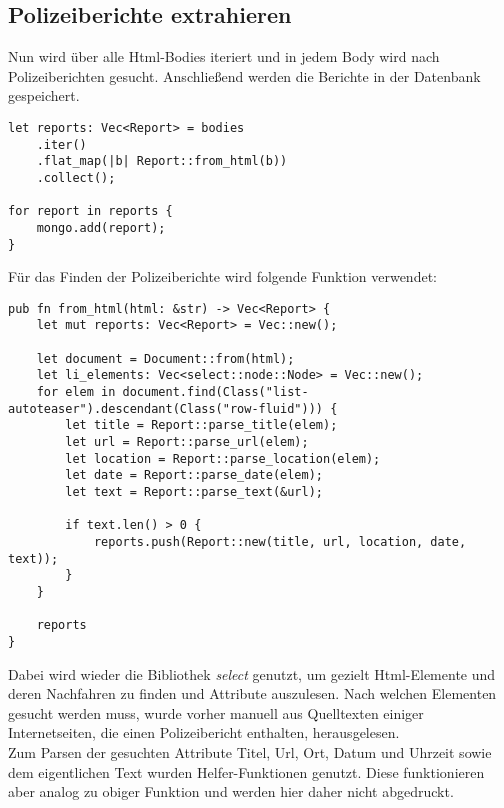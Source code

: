 \subsection{Polizeiberichte extrahieren}
Nun wird über alle Html-Bodies iteriert und in jedem Body wird nach
Polizeiberichten gesucht. Anschließend werden die Berichte in der Datenbank
gespeichert.

\begin{verbatim}
let reports: Vec<Report> = bodies
    .iter()
    .flat_map(|b| Report::from_html(b))
    .collect();

for report in reports {
    mongo.add(report);
}
\end{verbatim}

Für das Finden der Polizeiberichte wird folgende Funktion verwendet:

\begin{verbatim}
pub fn from_html(html: &str) -> Vec<Report> {
    let mut reports: Vec<Report> = Vec::new();

    let document = Document::from(html);
    let li_elements: Vec<select::node::Node> = Vec::new();
    for elem in document.find(Class("list-autoteaser").descendant(Class("row-fluid"))) {
        let title = Report::parse_title(elem);
        let url = Report::parse_url(elem);
        let location = Report::parse_location(elem);
        let date = Report::parse_date(elem);
        let text = Report::parse_text(&url);

        if text.len() > 0 {
            reports.push(Report::new(title, url, location, date, text));
        }
    }

    reports
}
\end{verbatim}

Dabei wird wieder die Bibliothek \emph{select} genutzt, um gezielt Html-Elemente
und deren Nachfahren zu finden und Attribute auszulesen. Nach welchen
Elementen gesucht werden muss, wurde vorher manuell aus Quelltexten einiger
Internetseiten, die einen Polizeibericht enthalten, herausgelesen.\\
Zum Parsen der gesuchten Attribute Titel, Url, Ort, Datum und Uhrzeit sowie
dem eigentlichen Text wurden Helfer-Funktionen genutzt. Diese funktionieren
aber analog zu obiger Funktion und werden hier daher nicht abgedruckt.

